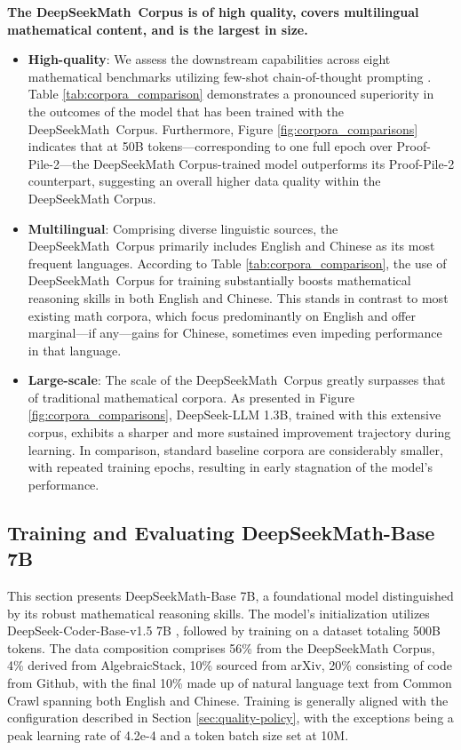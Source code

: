 \begin{itemize}[topsep=0pt]
\textbf{The DeepSeekMath~Corpus is of high quality, covers multilingual mathematical content, and is the largest in size.}

\begin{itemize}[topsep=0pt]
    \item \textbf{High-quality}:
    We assess the downstream capabilities across eight mathematical benchmarks utilizing few-shot chain-of-thought prompting \cite{cot}. Table \ref{tab:corpora_comparison} demonstrates a pronounced superiority in the outcomes of the model that has been trained with the DeepSeekMath~Corpus. Furthermore, Figure \ref{fig:corpora_comparisons} indicates that at 50B tokens—corresponding to one full epoch over Proof-Pile-2—the DeepSeekMath Corpus-trained model outperforms its Proof-Pile-2 counterpart, suggesting an overall higher data quality within the DeepSeekMath Corpus.
    \item \textbf{Multilingual}:
    Comprising diverse linguistic sources, the DeepSeekMath~Corpus primarily includes English and Chinese as its most frequent languages. According to Table \ref{tab:corpora_comparison}, the use of DeepSeekMath~Corpus for training substantially boosts mathematical reasoning skills in both English and Chinese. This stands in contrast to most existing math corpora, which focus predominantly on English and offer marginal—if any—gains for Chinese, sometimes even impeding performance in that language.
    \item \textbf{Large-scale}:
    The scale of the DeepSeekMath~Corpus greatly surpasses that of traditional mathematical corpora. As presented in Figure \ref{fig:corpora_comparisons}, DeepSeek-LLM 1.3B, trained with this extensive corpus, exhibits a sharper and more sustained improvement trajectory during learning. In comparison, standard baseline corpora are considerably smaller, with repeated training epochs, resulting in early stagnation of the model’s performance.
\end{itemize}

\subsection{Training and Evaluating DeepSeekMath-Base 7B}

This section presents DeepSeekMath-Base 7B, a foundational model distinguished by its robust mathematical reasoning skills. The model's initialization utilizes DeepSeek-Coder-Base-v1.5 7B \citep{deepseek-coder}, followed by training on a dataset totaling 500B tokens. The data composition comprises 56\% from the DeepSeekMath Corpus, 4\% derived from AlgebraicStack, 10\% sourced from arXiv, 20\% consisting of code from Github, with the final 10\% made up of natural language text from Common Crawl spanning both English and Chinese. Training is generally aligned with the configuration described in Section \ref{sec:quality-policy}, with the exceptions being a peak learning rate of 4.2e-4 and a token batch size set at 10M.


\end{itemize}
